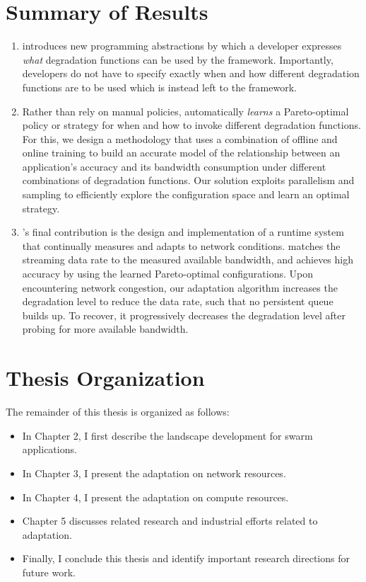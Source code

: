 \documentclass[thesis.tex]{subfiles}
\begin{document}

\section{Summary of Results}
\label{sec:summary-results-1}

\begin{enumerate}
\item \sysname{} introduces new programming abstractions by which a developer
  expresses \emph{what} degradation functions can be used by the framework.
  Importantly, developers do not have to specify exactly when and how different
  degradation functions are to be used which is instead left to the \sysname{}
  framework.

\item Rather than rely on manual policies, \sysname{} automatically
  \emph{learns} a Pareto-optimal policy or strategy for when and how to invoke
  different degradation functions.  For this, we design a methodology that uses
  a combination of offline and online training to build an accurate model of the
  relationship between an application's accuracy and its bandwidth consumption
  under different combinations of degradation functions. Our solution exploits
  parallelism and sampling to efficiently explore the configuration space and
  learn an optimal strategy.

\item \sysname{}'s final contribution is the design and implementation of a
  runtime system that continually measures and adapts to network conditions.
  \sysname{} matches the streaming data rate to the measured available
  bandwidth, and achieves high accuracy by using the learned Pareto-optimal
  configurations.  Upon encountering network congestion, our adaptation
  algorithm increases the degradation level to reduce the data rate, such that
  no persistent queue builds up. To recover, it progressively decreases the
  degradation level after probing for more available bandwidth.
\end{enumerate}

\section{Thesis Organization}
\label{sec:thesis-organization}

The remainder of this thesis is organized as follows:

\begin{itemize}
\item In Chapter 2, I first describe the landscape development for swarm
  applications.
\item In Chapter 3, I present the adaptation on network resources.
\item In Chapter 4, I present the adaptation on compute resources.
\item Chapter 5 discusses related research and industrial efforts related to
  adaptation.
\item Finally, I conclude this thesis and identify important research directions
  for future work.
\end{itemize}
\end{document}
